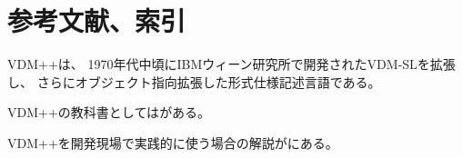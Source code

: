 \documentclass[a4paper,10pt]{jsarticle}
\begin{document}
\newpage

\section{参考文献、索引}
VDM++\cite{Kyushu2016PP}は、
1970年代中頃にIBMウィーン研究所で開発されたVDM-SL\cite{Kyushu2016SL}を拡張し、
さらにオブジェクト指向拡張した形式仕様記述言語である。


VDM++の教科書としては\cite{Sakoh2010}がある。

VDM++を開発現場で実践的に使う場合の解説が\cite{Sahara2008}にある。


%

%


\printindex
\end{document}

